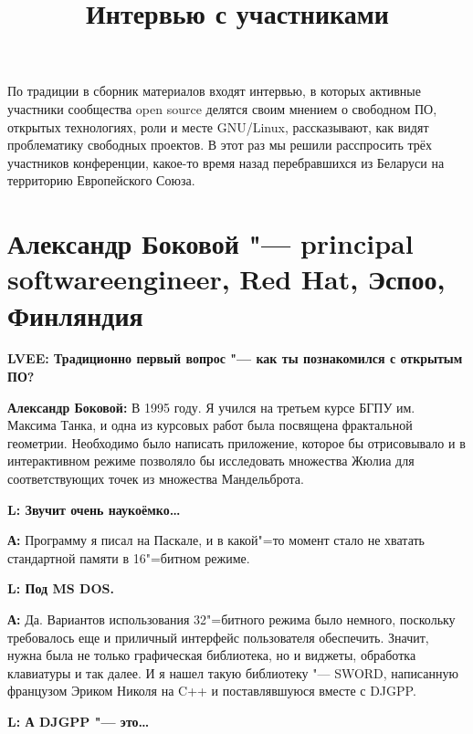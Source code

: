\documentclass[10pt, a5paper]{article}
\begin{document}
\title{Интервью с участниками}
\date{}
\maketitle

По традиции в сборник материалов входят интервью, в которых активные участники сообщества open source делятся своим мнением о свободном ПО, открытых технологиях, роли и месте GNU/Linux, рассказывают, как видят проблематику свободных проектов. В этот раз мы решили расспросить трёх участников конференции, какое-то время назад перебравшихся из Беларуси на территорию Европейского Союза.

\section[Александр Боковой "--- principal software engineer, Red Hat, Эспоо, Финляндия]{Александр Боковой "--- principal software\linebreak engineer, Red Hat, Эспоо, Финляндия}

{\noindent \bf LVEE: Традиционно первый вопрос "--- как ты познакомился с открытым ПО?}

{\noindent \bf Александр Боковой:} В 1995 году. Я учился на третьем курсе БГПУ им. Максима Танка, и одна из курсовых
работ была посвящена фрактальной геометрии. Необходимо было написать
приложение, которое бы отрисовывало и в интерактивном режиме позволяло бы
исследовать множества Жюлиа для соответствующих точек из множества
Мандельброта. 

{\noindent \bf L: Звучит очень наукоёмко\ldots}

{\noindent \bf А:} Программу я писал на Паскале, и в какой"=то момент стало не хватать
стандартной памяти в 16"=битном режиме.

{\noindent \bf L: Под MS DOS.} 

{\noindent \bf А:}  Да. Вариантов использования 32"=битного
режима было немного, поскольку требовалось еще и приличный интерфейс
пользователя обеспечить. Значит, нужна была не только графическая библиотека,
но и виджеты, обработка клавиатуры и так далее. И я нашел такую библиотеку "--- SWORD,
написанную французом Эриком Николя на C++ и поставлявшуюся вместе с DJGPP.

{\noindent \bf L: А DJGPP "--- это\ldots}
\end{document}
